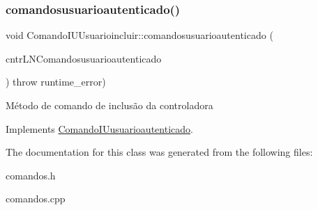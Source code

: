 \subsubsection{\texorpdfstring{comandosusuarioautenticado()}{comandosusuarioautenticado()}}
{\footnotesize\ttfamily void Comando\+I\+U\+Usuarioincluir\+::comandosusuarioautenticado (\begin{DoxyParamCaption}\item[{\hyperlink{classILNComandosusuarioautenticado}{I\+L\+N\+Comandosusuarioautenticado} $\ast$}]{cntr\+L\+N\+Comandosusuarioautenticado }\end{DoxyParamCaption}) throw  runtime\+\_\+error) \hspace{0.3cm}{\ttfamily [virtual]}}

Método de comando de inclusão da controladora 

Implements \hyperlink{classComandoIUusuarioautenticado}{Comando\+I\+Uusuarioautenticado}.



The documentation for this class was generated from the following files\+:\begin{DoxyCompactItemize}
\item 
comandos.\+h\item 
comandos.\+cpp\end{DoxyCompactItemize}
